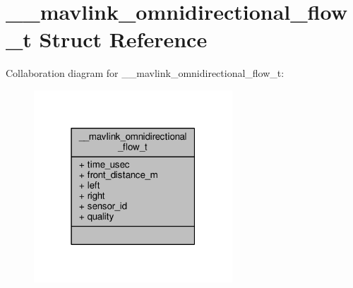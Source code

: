 \hypertarget{struct____mavlink__omnidirectional__flow__t}{\section{\+\_\+\+\_\+mavlink\+\_\+omnidirectional\+\_\+flow\+\_\+t Struct Reference}
\label{struct____mavlink__omnidirectional__flow__t}
}


Collaboration diagram for \+\_\+\+\_\+mavlink\+\_\+omnidirectional\+\_\+flow\+\_\+t\+:
\nopagebreak
\begin{figure}[H]
\begin{center}
\leavevmode
\includegraphics[width=211pt]{struct____mavlink__omnidirectional__flow__t__coll__graph}
\end{center}
\end{figure}
